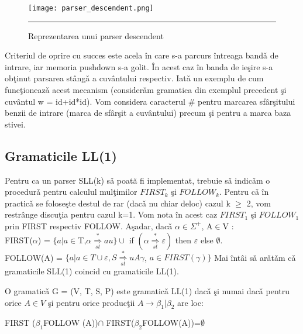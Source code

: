 \begin{figure}[htbp]
\centering
\texttt{[image: parser\_descendent.png]}
	\rule{35em}{0.5pt}
\caption{Reprezentarea unui parser descendent}
	\label{fig:ParserDescendent}
\end{figure}


Criteriul de oprire cu succes este acela \^ in care s-a parcurs \^ intreaga band\v a de intrare, iar memoria pushdown s-a golit. \^ In acest caz \^ in banda de ie\c sire s-a ob\c tinut parsarea st\^ ang\v a a cuv\^ antului respectiv. Iat\v a
un exemplu de cum func\c tioneaz\v a
acest mecanism (consider\v am
gramatica din exemplul precedent
\c si cuv\^ antul w = id+id*id). Vom considera caracterul \# pentru marcarea sf\^ ar\c sitului benzii de intrare (marca de sf\^ ar\c sit a cuv\^ antului) precum \c si pentru a marca baza stivei. 

\subsection{Gramaticile LL(1)}
Pentru ca un parser SLL(k) s\v a
poată fi implementat, trebuie s\v a
indic\v am o procedur\v a
pentru calculul mul\c timilor $FIRST_{k}$ \c si $FOLLOW_{k}$. Pentru c\v a \^ in practic\v a
se folose\c ste destul de rar (dac\v a nu chiar deloc) cazul k $\geq$ 2, vom restr\^ ange discu\c tia pentru cazul k=1. Vom nota \^ in acest caz $FIRST_{1}$ şi $FOLLOW_{1}$
prin FIRST respectiv FOLLOW.
A\c sadar, dac\v a
$\alpha\in \Sigma^{+}$, A$\in$V : \\
FIRST($\alpha$) = $\{a| a\in$T,$\alpha \overset{*}{\underset{st}{\Rightarrow}} au \}\cup$
if $(\alpha\overset{*}{\underset{st}{\Rightarrow}} \varepsilon)$ then ${\varepsilon}$ else $\emptyset$. \\
FOLLOW(A) = $\{a|a\in T \cup{\varepsilon}, S\overset{*}{\underset{st}{\Rightarrow}}uA\gamma$, $a\in FIRST (\gamma) \}$
Mai \^ int\^ ai s\v a ar\v at\v am c\v a gramaticile SLL(1) coincid cu gramaticile LL(1).  
\begin{theorem}
 O gramatic\v a G = (V, T, S, P) este gramatic\v a LL(1) dac\v a \c si numai dac\v a pentru orice $A \in V$ \c si pentru orice produc\c tii $A\rightarrow \beta_{1}|\beta_{2}$
are loc:
 \begin{flushleft}
 FIRST ($\beta_{1}$FOLLOW (A))$\cap$ 	FIRST($\beta_{2}$FOLLOW(A))=$\emptyset$
 \end{flushleft}

\end{theorem}

